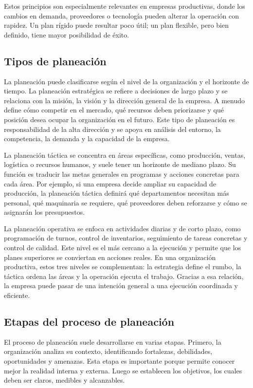 Estos principios son especialmente relevantes en empresas productivas, donde los cambios en demanda, proveedores o tecnología pueden alterar la operación con rapidez. Un plan rígido puede resultar poco útil; un plan flexible, pero bien definido, tiene mayor posibilidad de éxito.

\subsection{Tipos de planeación}
La planeación puede clasificarse según el nivel de la organización y el horizonte de tiempo. La planeación estratégica se refiere a decisiones de largo plazo y se relaciona con la misión, la visión y la dirección general de la empresa. A menudo define cómo competir en el mercado, qué recursos deben priorizarse y qué posición desea ocupar la organización en el futuro. Este tipo de planeación es responsabilidad de la alta dirección y se apoya en análisis del entorno, la competencia, la demanda y la capacidad de la empresa.

La planeación táctica se concentra en áreas específicas, como producción, ventas, logística o recursos humanos, y suele tener un horizonte de mediano plazo. Su función es traducir las metas generales en programas y acciones concretas para cada área. Por ejemplo, si una empresa decide ampliar su capacidad de producción, la planeación táctica definirá qué departamentos necesitan más personal, qué maquinaria se requiere, qué proveedores deben reforzarse y cómo se asignarán los presupuestos.

La planeación operativa se enfoca en actividades diarias y de corto plazo, como programación de turnos, control de inventarios, seguimiento de tareas concretas y control de calidad. Este nivel es el más cercano a la ejecución y permite que los planes superiores se conviertan en acciones reales. En una organización productiva, estos tres niveles se complementan: la estrategia define el rumbo, la táctica ordena las áreas y la operación ejecuta el trabajo. Gracias a esa relación, la empresa puede pasar de una intención general a una ejecución coordinada y eficiente.

\subsection{Etapas del proceso de planeación}
El proceso de planeación suele desarrollarse en varias etapas. Primero, la organización analiza su contexto, identificando fortalezas, debilidades, oportunidades y amenazas. Esta etapa es importante porque permite conocer mejor la realidad interna y externa. Luego se establecen los objetivos, los cuales deben ser claros, medibles y alcanzables.

